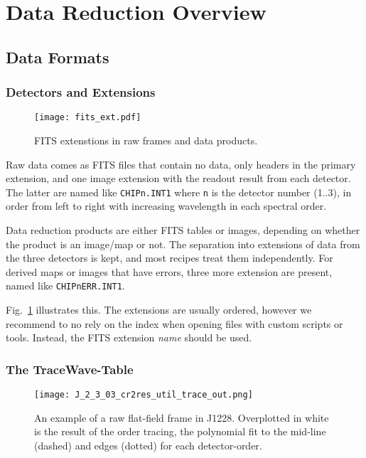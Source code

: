 \section{Data Reduction Overview}
\label{sec:overview}


\subsection{Data Formats}
\label{sec:data-fmt-quick}

\subsubsection{Detectors and Extensions}
\label{sec:extns}
\begin{figure}[!tb]
  \begin{center}
    \texttt{[image: fits\_ext.pdf]}
  \end{center}
  \caption{
    \label{fig:fits_ext}
    FITS extenstions in raw frames and data products.
    }
\end{figure}

Raw data comes as FITS files that contain no data, only headers in the
primary extension, and one image extension with the readout result from each
detector. The latter are named like \texttt{CHIPn.INT1} where \texttt{n} is
the detector number (1..3), in order from left to right with increasing
wavelength in each spectral order.

Data reduction products are either FITS tables or images, depending on whether
the product is an image/map or not. The separation into extensions of data from
the three detectors is kept, and most recipes treat them independently. For
derived maps or images that have errors, three more extension are present, named
like \texttt{CHIPnERR.INT1}.

Fig.~\ref{fig:fits_ext} illustrates this. The extensions are usually ordered,
however we recommend to no rely on the index when opening files with custom
scripts or tools. Instead, the FITS extension \emph{name} should be used.

\subsubsection{The TraceWave-Table}
\label{sec:tracewave}

\begin{figure}[!tb]
    \begin{center}
      \texttt{[image: J\_2\_3\_03\_cr2res\_util\_trace\_out.png]}
    \end{center}
    \caption{
      \label{fig:flat_trace}
      An example of a raw flat-field frame in J1228. Overplotted in white is 
      the result of the order tracing, the polynomial fit to the mid-line
      (dashed) and edges (dotted) for each detector-order.
      }
  \end{figure}

